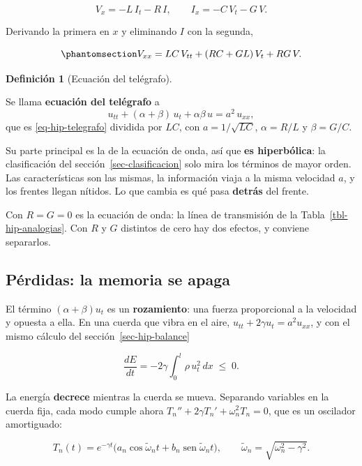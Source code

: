 \documentclass[
  spanish,
  a4paper,
]{scrbook}
\theoremstyle{definition}
\newtheorem{definition}{Definición}[chapter]
\theoremstyle{plain}
\theoremstyle{definition}
\theoremstyle{plain}
\theoremstyle{definition}
\theoremstyle{remark}
\begin{document}
\[
V_x = -L\,I_t - R\,I, \qquad I_x = -C\,V_t - G\,V .
\]

Derivando la primera en \(x\) y eliminando \(I\) con la segunda,

\begin{equation}\protect\phantomsection\label{eq-hip-telegrafo}{
V_{xx} = LC\,V_{tt} + (RC + GL)\,V_t + RG\,V .
}\end{equation}

\begin{definition}[Ecuación del
telégrafo]\protect\hypertarget{def-hip-telegrafo}{}\label{def-hip-telegrafo}

Se llama \textbf{ecuación del telégrafo} a \[
u_{tt} + (\alpha+\beta)\,u_t + \alpha\beta\,u = a^2\,u_{xx},
\] que es \ref{eq-hip-telegrafo} dividida por \(LC\), con
\(a = 1/\sqrt{LC}\), \(\alpha = R/L\) y \(\beta = G/C\).

\end{definition}

Su parte principal es la de la ecuación de onda, así que \textbf{es
hiperbólica}: la clasificación del sección~\ref{sec-clasificacion} solo
mira los términos de mayor orden. Las características son las mismas, la
información viaja a la misma velocidad \(a\), y los frentes llegan
nítidos. Lo que cambia es qué pasa \textbf{detrás} del frente.

Con \(R = G = 0\) es la ecuación de onda: la línea de transmisión de la
Tabla~\ref{tbl-hip-analogias}. Con \(R\) y \(G\) distintos de cero hay
dos efectos, y conviene separarlos.

\subsection{Pérdidas: la memoria se apaga}\label{sec-hip-perdidas}

El término \((\alpha+\beta)u_t\) es un \textbf{rozamiento}: una fuerza
proporcional a la velocidad y opuesta a ella. En una cuerda que vibra en
el aire, \(u_{tt} + 2\gamma u_t = a^2u_{xx}\), y con el mismo cálculo
del sección~\ref{sec-hip-balance}

\[
\frac{dE}{dt} = -2\gamma\int_0^l\rho\,u_t^2\,dx \;\le\; 0 .
\]

La energía \textbf{decrece} mientras la cuerda se mueva. Separando
variables en la cuerda fija, cada modo cumple ahora
\(T_n'' + 2\gamma T_n' + \omega_n^2T_n = 0\), que es un oscilador
amortiguado:

\[
T_n(t) = e^{-\gamma t}\big(a_n\cos\tilde\omega_nt + b_n\operatorname{sen}\tilde\omega_nt\big),
\qquad \tilde\omega_n = \sqrt{\omega_n^2-\gamma^2} .
\]
\end{document}
